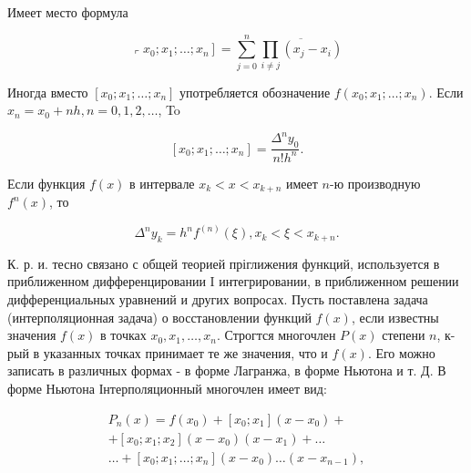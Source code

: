 \documentclass[10pt]{article}
\begin{document}
Имеет место формула



\[

\left\ulcorner x_{0} ; x_{1} ; \ldots ; x_{n}\right]=\sum_{j=0}^{n} \overline{\prod_{i \neq j}\left(x_{j}-x_{i}\right)}

\]



Иногда вместо $\left[x_{0} ; x_{1} ; \ldots ; x_{n}\right]$ употребляется обозначение $f\left(x_{0} ; x_{1} ; \ldots ; x_{n}\right)$. Если $x_{n}=x_{0}+n h, n=0,1,2, \ldots$, To



\[

\left[x_{0} ; x_{1} ; \ldots ; x_{n}\right]=\frac{\Delta^{n} y_{0}}{n ! h^{n}} .

\]



Если функция $f(x)$ в интервале $x_{k}<x<x_{k+n}$ имеет $n$-ю производную $f^{n}(x)$, то



\[

\Delta^{n} y_{k}=h^{n} f^{(n)}(\xi), x_{k}<\xi<x_{k+n} .

\]



К. р. и. тесно связано с общей теорией пріглижения функций, используется в приближенном дифференцировании I интегрировании, в приближенном решении дифференциальных уравнений и других вопросах. Пусть поставлена задача (интерполяционная задача) о восстановлении функций $f(x)$, если известны значения $f(x)$ в точках $x_{0}, x_{1}, \ldots, x_{n}$. Строгтся многочлен $P(x)$ степени $n$, к-рый в указанных точках принимает те же значения, что и $f(x)$. Его можно записать в различных формах - в форме Лагранжа, в форме Ньютона и т. Д. В форме Ньютона Інтерполяционный многочлен имеет вид:



\[

\begin{gathered}

P_{n}(x)=f\left(x_{0}\right)+\left[x_{0} ; x_{1}\right]\left(x-x_{0}\right)+ \\

+\left[x_{0} ; x_{1} ; x_{2}\right]\left(x-x_{0}\right)\left(x-x_{1}\right)+\ldots \\

\ldots+\left[x_{0} ; x_{1} ; \ldots ; x_{n}\right]\left(x-x_{0}\right) \ldots\left(x-x_{n-1}\right),

\end{gathered}

\]
\end{document}
